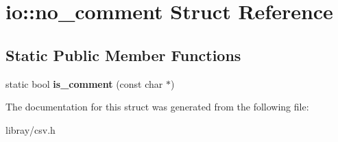 \hypertarget{structio_1_1no__comment}{}\section{io\+:\+:no\+\_\+comment Struct Reference}
\label{structio_1_1no__comment}
\subsection*{Static Public Member Functions}
\begin{DoxyCompactItemize}
\item 
\mbox{\label{structio_1_1no__comment_a52b252547482e28edd076ee2224bc8d8}} 
static bool {\bfseries is\+\_\+comment} (const char $\ast$)
\end{DoxyCompactItemize}


The documentation for this struct was generated from the following file\+:\begin{DoxyCompactItemize}
\item 
libray/csv.\+h\end{DoxyCompactItemize}

